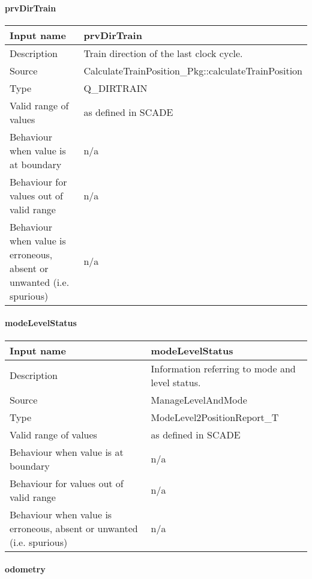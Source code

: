 \paragraph{prvDirTrain}

\begin{longtable}{p{}p{}}
\toprule
Input name				& prvDirTrain \\
\midrule
Description				& Train direction of the last clock cycle. \\
\midrule
Source					& CalculateTrainPosition\_Pkg::calculateTrainPosition \\ 
\midrule
Type					& Q\_DIRTRAIN \\
\midrule
Valid range of values	& as defined in SCADE \\
\midrule
Behaviour when value is at boundary	& n/a \\
\midrule
Behaviour for values out of valid range	& n/a \\
\midrule
Behaviour when value is erroneous, absent or unwanted (i.e. spurious) & n/a \\
\bottomrule
\end{longtable}

\paragraph{modeLevelStatus}

\begin{longtable}{p{}p{}}
\toprule
Input name				& modeLevelStatus \\
\midrule
Description				& Information referring to mode and level status. \\
\midrule
Source					& ManageLevelAndMode \\ 
\midrule
Type					& ModeLevel2PositionReport\_T \\
\midrule
Valid range of values	& as defined in SCADE \\
\midrule
Behaviour when value is at boundary	& n/a \\
\midrule
Behaviour for values out of valid range	& n/a \\
\midrule
Behaviour when value is erroneous, absent or unwanted (i.e. spurious) & n/a \\
\bottomrule
\end{longtable}

\paragraph{odometry}

